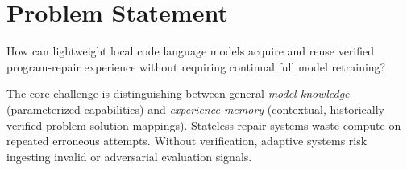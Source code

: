 \section{Problem Statement}
How can lightweight local code language models acquire and reuse verified program-repair experience without requiring continual full model retraining? 

The core challenge is distinguishing between general \textit{model knowledge} (parameterized capabilities) and \textit{experience memory} (contextual, historically verified problem-solution mappings). Stateless repair systems waste compute on repeated erroneous attempts. Without verification, adaptive systems risk ingesting invalid or adversarial evaluation signals.
